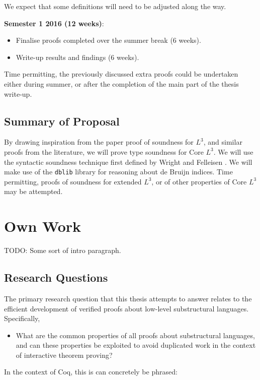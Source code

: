 \documentclass[]{unswthesis}
\let\c\texttt
\begin{document}
We expect that some definitions will need to be adjusted along the way.

\textbf{Semester 1 2016 (12 weeks)}:

\begin{itemize}
\item Finalise proofs completed over the summer break (6 weeks).
\item Write-up results and findings (6 weeks).
\end{itemize}

Time permitting, the previously discussed extra proofs could be undertaken either during summer, or after the completion of the main part of the thesis write-up.

\section{Summary of Proposal}

By drawing inspiration from the paper proof of soundness for $L^3$, and similar proofs from the literature, we will prove type soundness for Core $L^3$. We will use the syntactic soundness technique first defined by Wright and Felleisen \cite{wright94}. We will make use of the \c{dblib} library \cite{dblib13} for reasoning about de Bruijn indices. Time permitting, proofs of soundness for extended $L^3$, or of other properties of Core $L^3$ may be attempted.

\chapter{Own Work}

TODO: Some sort of intro paragraph.

\section{Research Questions}

The primary research question that this thesis attempts to answer relates to the efficient development of verified proofs about low-level substructural languages. Specifically,

\begin{itemize}
\item What are the common properties of all proofs about substructural languages, and can these properties be exploited to avoid duplicated work in the context of interactive theorem proving?
\end{itemize}

In the context of Coq, this is can concretely be phrased:
\end{document}
